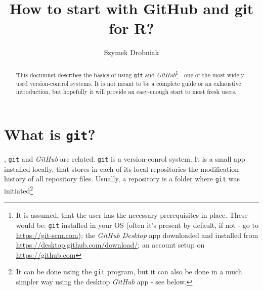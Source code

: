 \documentclass{tufte-handout}
\title[How to start with GitHub and git for R?]{How to start with GitHub and git for \textnormal{\textsf{R}}?}
\author[Szymon M. Drobniak]{Szymek Drobniak}
\begin{document}
\maketitle%

\begin{abstract}
\noindent This documnet describes the basics of using \texttt{git} and \textit{GitHub}\footnote{It is assumed, that the user has the necessary prerequisites in place. These would be: \texttt{git} installed in your OS (often it's present by default, if not - go to \url{https://git-scm.com}); the \textit{GitHub Desktop} app downloaded and installed from \url{https://desktop.github.com/download/}; an account setup on \url{https://github.com}} - one of the most widely used version-control systems. It is not meant to be a complete guide or an exhaustive introduction, but hopefully it will provide an easy-enough start to most fresh users.
\end{abstract}


\section[What is git?]{What is \textnormal{\texttt{git}}?}\label{sec:what-git}

, \texttt{git} and \textit{GitHub} are related. \texttt{git} is a version-conrol system. It is a small app installed locally, that stores in each of its local repositories the modification history of all repository files. Usually, a repository is a folder where \texttt{git} was initiated\footnote{It can be done using the \texttt{git} program, but it can also be done in a much simpler way using the desktop \textit{GitHub} app - see below.}
\end{document}
